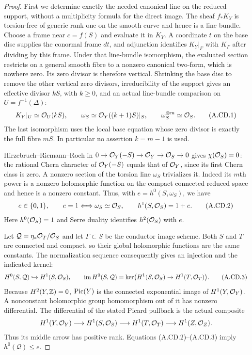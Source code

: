 \begin{proof}
First we determine exactly the needed canonical line on
the reduced support, without a multiplicity formula for
the direct image. The sheaf $f_*K_Y$ is torsion-free of
generic rank one on the smooth curve and hence is a
line bundle. Choose a frame near $c=f(S)$ and evaluate
it in $K_Y$. A coordinate $t$ on the base disc supplies
the conormal frame $dt$, and adjunction identifies
$K_Y|_F$ with $K_F$ after dividing by this frame.
Under that line-bundle isomorphism, the evaluated
section restricts on a general smooth fibre to a
nonzero canonical two-form, which is nowhere zero.
Its zero divisor is therefore
vertical. Shrinking the base disc to remove the other
vertical zero divisors, irreducibility of the support
gives an effective divisor $kS$, with $k\ge0$, and an
actual line-bundle comparison on $U=f^{-1}(\Delta)$:
\[
 K_Y|_U\simeq\mathcal O_U(kS),\qquad
 \omega_S\simeq\mathcal O_Y((k+1)S)|_S,\qquad
 \omega_S^{\otimes m}\simeq\mathcal O_S.                 \tag{A.CD.1}
\]
The last isomorphism uses the local base equation whose
zero divisor is exactly the full fibre $mS$.
In particular no assertion $k=m-1$ is used.

Hirzebruch--Riemann--Roch in
$0\to\mathcal O_Y(-S)\to\mathcal O_Y\to\mathcal O_S\to0$ gives
$\chi(\mathcal O_S)=0$: the rational Chern character of
$\mathcal O_Y(-S)$ equals that of $\mathcal O_Y$, since its first
Chern class is zero. A nonzero section of the torsion
line $\omega_S$ trivializes it. Indeed its $m$th power
is a nonzero holomorphic function on the compact
connected reduced space and hence is a nonzero constant.
Thus, with $e=h^0(S,\omega_S)$, we have
\[
 e\in\{0,1\},\qquad
 e=1\Longleftrightarrow\omega_S\simeq\mathcal O_S,
 \qquad h^1(S,\mathcal O_S)=1+e.                         \tag{A.CD.2}
\]
Here $h^0(\mathcal O_S)=1$ and Serre duality identifies
$h^2(\mathcal O_S)$ with $e$.

Let $\mathcal Q=\eta_*\mathcal O_T/\mathcal O_S$ and let
$\Gamma\subset S$ be the conductor image scheme.
Both $S$ and $T$ are connected and compact, so their
global holomorphic functions are the same constants.
The normalization sequence consequently gives an
injection and the indicated kernel:
\[
 H^0(S,\mathcal Q)\hookrightarrow H^1(S,\mathcal O_S),
 \qquad
 \operatorname{im}H^0(S,\mathcal Q)
 =\ker\bigl(H^1(S,\mathcal O_S)\to H^1(T,\mathcal O_T)\bigr).
                                                               \tag{A.CD.3}
\]
Because $H^2(Y,\mathbb Z)=0$, $\operatorname{Pic}(Y)$ is the connected
exponential image of $H^1(Y,\mathcal O_Y)$. A nonconstant
holomorphic group homomorphism out of it has nonzero
differential. The differential of the stated Picard
pullback is the actual composite
\[
 H^1(Y,\mathcal O_Y)\longrightarrow H^1(S,\mathcal O_S)
 \longrightarrow H^1(T,\mathcal O_T)
 \longrightarrow H^1(Z,\mathcal O_Z).
\]
Thus its middle arrow has positive rank. Equations
(A.CD.2)--(A.CD.3) imply $h^0(\mathcal Q)\le e$.


\end{proof}
